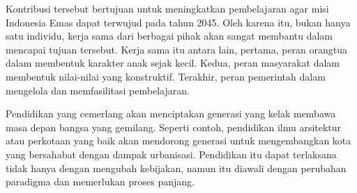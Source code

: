 \documentclass[../main.tex]{subfiles}
\begin{document}
Kontribusi tersebut bertujuan untuk meningkatkan pembelajaran agar misi Indonesia Emas dapat terwujud pada tahun 2045. Oleh karena itu, bukan hanya satu individu, kerja sama dari berbagai pihak akan sangat membantu dalam mencapai tujuan tersebut. Kerja sama itu antara lain, pertama, peran orangtua dalam membentuk karakter anak sejak kecil. Kedua, peran masyarakat dalam membentuk nilai-nilai yang konstruktif. Terakhir, peran pemerintah dalam mengelola dan memfasilitasi pembelajaran.

Pendidikan yang cemerlang akan menciptakan generasi yang kelak membawa masa depan bangsa yang gemilang. Seperti contoh, pendidikan ilmu arsitektur atau perkotaan yang baik akan mendorong generasi untuk mengembangkan kota yang bersahabat dengan dampak urbanisasi. Pendidikan itu dapat terlaksana tidak hanya dengan mengubah kebijakan, namun itu diawali dengan perubahan paradigma dan memerlukan proses panjang.
\end{document}
